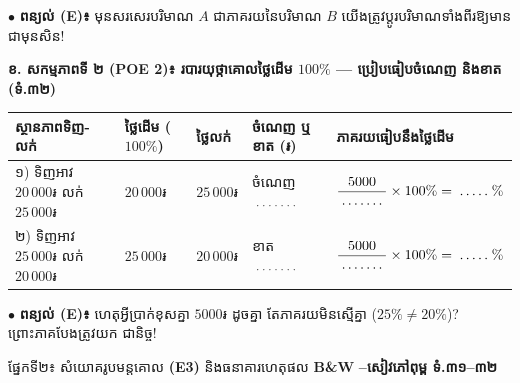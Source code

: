\documentclass[a4paper,10pt]{article}
\newcommand{\en}[1]{{\TimesEn #1}}
\newcommand{\enbf}[1]{{\TimesEn\bfseries #1}}
\newcommand{\cnum}[1]{\mbox{\fontsize{10pt}{12pt}\selectfont\ding{\numexpr181+#1\relax}}}
\newcommand{\blank}[1][1.5cm]{\makebox[#1]{\dotfill}}
\newcommand{\secbar}[2]{%
  \begin{tcolorbox}[enhanced, sharp corners, colback=headgray, colframe=black, boxrule=0.9pt, boxsep=1pt, top=2pt, bottom=2pt, left=5pt, right=5pt, before skip=4pt, after skip=3pt]
    {\muol\fontsize{9.2pt}{13pt}\selectfont #1}\hfill{\fontsize{8pt}{11pt}\selectfont\textbf{#2}}
  \end{tcolorbox}%
}
\begin{document}
\vspace{3pt}
$\bullet$ \textbf{ពន្យល់ (\en{E})៖} មុនសរសេរបរិមាណ $A$ ជាភាគរយនៃបរិមាណ $B$ យើងត្រូវប្ដូរបរិមាណទាំងពីរឱ្យមាន \blank[2.3cm] ជាមុនសិន!

\vspace{4pt}
\textbf{ខ. សកម្មភាពទី ២ (\en{POE 2})៖ របារយុថ្កាគោលថ្លៃដើម $100\%$ — ប្រៀបធៀបចំណេញ និងខាត (ទំ.៣២)}

{\renewcommand{\arraystretch}{1.46}
\begin{tabular}{|L{4.80cm}|C{2.70cm}|C{2.70cm}|C{3.40cm}|C{4.00cm}|}
  \hline
  \textbf{ស្ថានភាពទិញ-លក់} & \textbf{ថ្លៃដើម ($100\%$)} & \textbf{ថ្លៃលក់} & \textbf{ចំណេញ ឬ ខាត (៛)} & \textbf{ភាគរយធៀបនឹងថ្លៃដើម} \\
  \hline
  ១) ទិញអាវ $20\,000\text{៛}$ លក់ $25\,000\text{៛}$ & $20\,000\text{៛}$ & $25\,000\text{៛}$ & ចំណេញ $\blank[1.2cm]$ & $\dfrac{5000}{\blank[1.2cm]}\times 100\% = \blank[0.9cm]\%$ \\
  \hline
  ២) ទិញអាវ $25\,000\text{៛}$ លក់ $20\,000\text{៛}$ & $25\,000\text{៛}$ & $20\,000\text{៛}$ & ខាត $\blank[1.2cm]$ & $\dfrac{5000}{\blank[1.2cm]}\times 100\% = \blank[0.9cm]\%$ \\
  \hline
\end{tabular}}

\vspace{3pt}
$\bullet$ \textbf{ពន្យល់ (\en{E})៖} ហេតុអ្វីប្រាក់ខុសគ្នា $5000\text{៛}$ ដូចគ្នា តែភាគរយមិនស្មើគ្នា ($25\% \ne 20\%$)? ព្រោះភាគបែងត្រូវយក \blank[2.4cm] ជានិច្ច!

\secbar{ផ្នែកទី២៖ សំយោគរូបមន្តគោល \enbf{(E3)} និងធនាគារហេតុផល \enbf{B\&W} \cnum{1}\enbf{--}\cnum{5}}{សៀវភៅពុម្ព ទំ.៣១–៣២}
\end{document}
